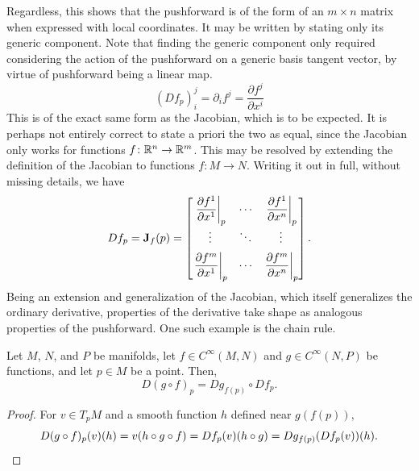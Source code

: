 \documentclass[a4paper,12pt]{article}
\begin{document}
Regardless, this shows that the pushforward is of the form of an $m \times n$ matrix when expressed with local coordinates.
It may be written by stating only its generic component.
Note that finding the generic component only required considering the action of the pushforward on a generic basis tangent vector, by virtue of pushforward being a linear map.
\begin{equation}
    (Df_p)^j_i = \partial_i f^j = \frac{\partial f^j}{\partial x^i}
\end{equation}
This is of the exact same form as the Jacobian, which is to be expected.
It is perhaps not entirely correct to state a priori the two as equal, since the Jacobian only works for functions $f \colon \mathbb{R}^n \to \mathbb{R}^m$.
This may be resolved by extending the definition of the Jacobian to functions $f \colon M \to N$.
Writing it out in full, without missing details, we have
\begin{equation}
    Df_p = \mathbf{J}_f (p) = \begin{bmatrix}
        \eval{\dfrac{\partial f^1}{\partial x^1}}{p} & \cdots & \eval{\dfrac{\partial f^1}{\partial x^n}}{p} \\[0.5em]
        \vdots & \ddots & \vdots \\[0.5em]
        \eval{\dfrac{\partial f^m}{\partial x^1}}{p} & \cdots & \eval{\dfrac{\partial f^m}{\partial x^n}}{p}
    \end{bmatrix}.
\end{equation}
Being an extension and generalization of the Jacobian, which itself generalizes the ordinary derivative, properties of the derivative take shape as analogous properties of the pushforward.
One such example is the chain rule.
\begin{proposition}\label{prop:chain_rule_for_pushforwards}
    Let $M$, $N$, and $P$ be manifolds, let $f \in C^\infty(M, N)$ and $g \in C^\infty(N, P)$ be functions, and let $p \in M$ be a point.
    Then,
    \begin{equation}
        D(g \circ f)_p = Dg_{f(p)} \circ Df_p.
    \end{equation}
\end{proposition}
\begin{proof}
    For $v \in T_p M$ and a smooth function $h$ defined near $g(f(p))$,
    \begin{equation*}
        D(g \circ f)_p(v)(h) = v(h \circ g \circ f) = Df_p(v)(h \circ g) = Dg_{f(p)}(Df_p(v))(h). \qedhere
    \end{equation*}
\end{proof}
\end{document}
